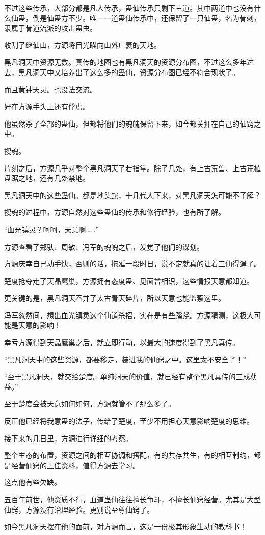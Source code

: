 \begin{this_body}
不过这些传承，大部分都是凡人传承，蛊仙传承只剩下三道。其中两道中也没有什么仙蛊，倒是仙蛊方不少。唯一一道蛊仙传承中，还保留了一只仙蛊，名为骨刺，隶属于骨道流派的攻击蛊虫。

收刮了继仙山，方源将目光瞄向山外广袤的天地。

黑凡洞天中资源无数。真传的地图也有黑凡洞天的资源分布图，不过这么多年过去，黑凡洞天中又培养出了这么多的蛊仙，资源分布图已经不符合现状了。

而且黄钟天灵。也没法交流。

好在方源手头上还有俘虏。

他虽然杀了全部的蛊仙，但都将他们的魂魄保留下来，如今都关押在自己的仙窍之中。

搜魂。

片刻之后，方源几乎对整个黑凡洞天了若指掌。除了几处，有上古荒兽、上古荒植盘踞之地，还有几处禁地。

黑凡洞天中的这些蛊仙。都是地头蛇，十几代人下来，对黑凡洞天怎可能不了解？

搜魂的过程中，方源自然对这些蛊仙的传承和修行经验，也有所了解。

“血光镇灵？呵呵，天意啊……”

方源查看了郑驮、周敏、冯军的魂魄之后，发觉了他们的谋划。

方源庆幸自己动手快，否则的话，拖延一段时日，说不定就真的让着三仙得逞了。

楚度抢夺走了天晶鹰巢，方源拥有态度蛊、见面曾相识，这些情报天意都知道。

更关键的是，黑凡洞天吞并了太古青天碎片，所以天意也能监察这里。

冯军忽然间，想出血光镇灵这个仙道杀招，实在是有些蹊跷。方源猜测，这极大可能是天意的影响！

幸亏方源得到天晶鹰巢之后，就立即行动，以最大的速度得到了黑凡真传。

“黑凡洞天中的这些资源，都要移走，装进我的仙窍之中。这里太不安全了！”

“至于黑凡洞天，就交给楚度。单纯洞天的价值，就已经有整个黑凡真传的三成获益。”

至于楚度会被天意如何如何，方源就管不了那么多了。

反正他已经将我意蛊的法子，传给了楚度，至少不用担心天意影响楚度的思维。

接下来的几日里，方源进行详细的考察。

整个生态的布置，资源之间的相互协调和搭配，有的共存共生，有的相互制约，都是经营仙窍的上佳资料，值得方源去学习。

这点他有些欠缺。

五百年前世，他资质不行，血道蛊仙往往擅长争斗，不擅长仙窍经营。尤其是大型仙窍，方源没有治理经验。更别说至尊仙窍了。

如今黑凡洞天摆在他的面前，对方源而言，这是一份极其形象生动的教科书！

\end{this_body}

